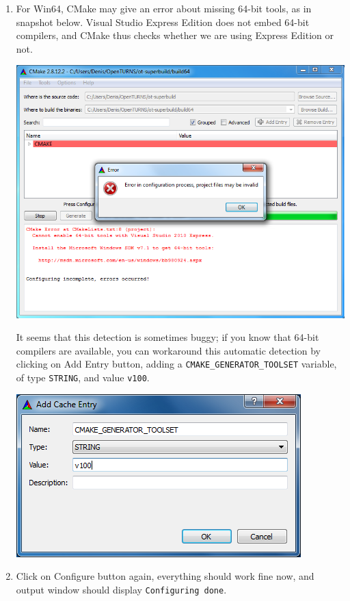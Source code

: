 \begin{enumerate}
\item For Win64, CMake may give an error about missing 64-bit tools, as in snapshot below.
Visual Studio Express Edition does not embed 64-bit compilers, and CMake thus checks whether
we are using Express Edition or not.
\begin{center}
  \includegraphics[scale=0.5]{Figures/win_native/cmake-gui-error.png}
\end{center}

It seems that this detection is sometimes buggy; if you know that 64-bit compilers are available,
you can workaround this automatic detection by clicking on \textsf{Add Entry} button, adding a
\texttt{CMAKE\_GENERATOR\_TOOLSET} variable, of type \texttt{STRING}, and value \texttt{v100}.
\begin{center}
  \includegraphics[scale=0.5]{Figures/win_native/cmake-gui-toolset.png}
\end{center}

\item Click on \textsf{Configure} button again, everything should work fine now, and output window should
display \texttt{Configuring done}.


\end{enumerate}
